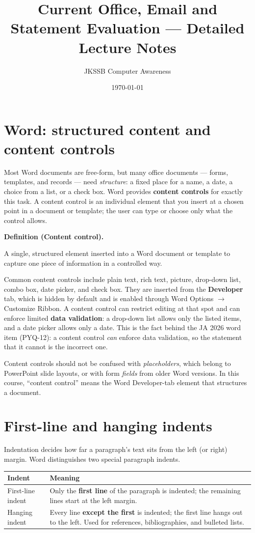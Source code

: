 \documentclass[11pt]{article}
\title{Current Office, Email and Statement Evaluation --- Detailed Lecture Notes}
\author{JKSSB Computer Awareness}
\date{\today}
\newenvironment{definitionbox}[1]{%
  \par\noindent\textbf{Definition (#1).}\ \itshape
}{\par\vspace{0.3em}}
\begin{document}
\maketitle

\section{Word: structured content and content controls}
Most Word documents are free-form, but many office documents --- forms,
templates, and records --- need \emph{structure}: a fixed place for a name, a
date, a choice from a list, or a check box. Word provides \textbf{content
controls} for exactly this task. A content control is an individual element
that you insert at a chosen point in a document or template; the user can type
or choose only what the control allows.

\begin{definitionbox}{Content control}
A single, structured element inserted into a Word document or template to
capture one piece of information in a controlled way.
\end{definitionbox}

Common content controls include plain text, rich text, picture, drop-down
list, combo box, date picker, and check box. They are inserted from the
\textbf{Developer} tab, which is hidden by default and is enabled through
Word Options $\rightarrow$ Customize Ribbon. A content control can restrict
editing at that spot and can enforce limited \textbf{data validation}: a
drop-down list allows only the listed items, and a date picker allows only a
date. This is the fact behind the JA 2026 word item (PYQ-12): a content
control \emph{can} enforce data validation, so the statement that it cannot is
the incorrect one.

Content controls should not be confused with \emph{placeholders}, which belong
to PowerPoint slide layouts, or with form \emph{fields} from older Word
versions. In this course, ``content control'' means the Word Developer-tab
element that structures a document.

\section{First-line and hanging indents}
Indentation decides how far a paragraph's text sits from the left (or right)
margin. Word distinguishes two special paragraph indents.

\begin{center}
\begin{tabular}{p{}p{}}
\toprule
\textbf{Indent} & \textbf{Meaning} \\
\midrule
First-line indent & Only the \textbf{first line} of the paragraph is indented;
the remaining lines start at the left margin. \\
Hanging indent & Every line \textbf{except the first} is indented; the first
line hangs out to the left. Used for references, bibliographies, and bulleted
lists. \\
\bottomrule
\end{tabular}
\end{center}
\end{document}
